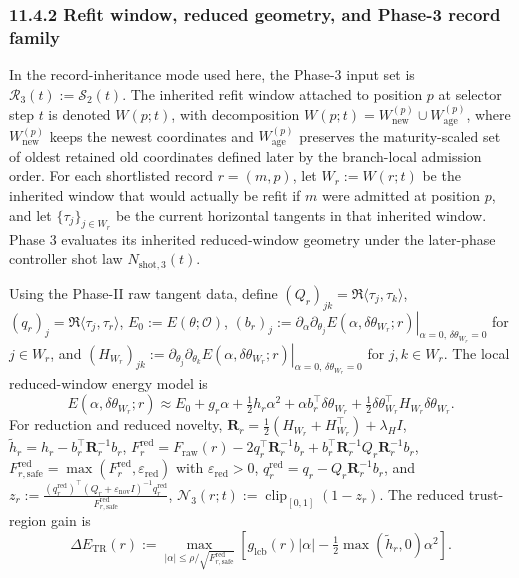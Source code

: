 \documentclass[11pt]{article}
\begin{document}
\subsubsection*{11.4.2 Refit window, reduced geometry, and Phase-3 record family}
In the record-inheritance mode used here, the Phase-3 input set is \(\mathcal R_3(t):=\mathcal S_2(t)\). The inherited refit window attached to position \(p\) at selector step \(t\) is denoted \(W(p;t)\), with decomposition \(W(p;t)=W_{\mathrm{new}}^{(p)}\cup W_{\mathrm{age}}^{(p)}\), where \(W_{\mathrm{new}}^{(p)}\) keeps the newest coordinates and \(W_{\mathrm{age}}^{(p)}\) preserves the maturity-scaled set of oldest retained old coordinates defined later by the branch-local admission order. For each shortlisted record \(r=(m,p)\), let \(W_r:=W(r;t)\) be the inherited window that would actually be refit if \(m\) were admitted at position \(p\), and let \(\{\tau_j\}_{j\in W_r}\) be the current horizontal tangents in that inherited window.
Phase 3 evaluates its inherited reduced-window geometry under the later-phase controller shot law \(N_{\mathrm{shot},3}(t)\).

Using the Phase-II raw tangent data, define \((Q_r)_{jk}=\Re\langle \tau_j,\tau_k\rangle\), \((q_r)_j=\Re\langle \tau_j,\tau_r\rangle\), \(E_0:=E(\theta;\mathcal O)\), \((b_r)_j:=\left.\partial_\alpha\partial_{\theta_j}E(\alpha,\delta\theta_{W_r};r)\right|_{\alpha=0,\,\delta\theta_{W_r}=0}\) for \(j\in W_r\), and \((H_{W_r})_{jk}:=\left.\partial_{\theta_j}\partial_{\theta_k}E(\alpha,\delta\theta_{W_r};r)\right|_{\alpha=0,\,\delta\theta_{W_r}=0}\) for \(j,k\in W_r\). The local reduced-window energy model is
\[
E(\alpha,\delta\theta_{W_r};r)
\approx
E_0+g_r\alpha+\tfrac12 h_r\alpha^2+\alpha b_r^\top\delta\theta_{W_r}+\tfrac12\delta\theta_{W_r}^\top H_{W_r}\delta\theta_{W_r}.
\]
For reduction and reduced novelty, \(\mathbf R_r=\tfrac12(H_{W_r}+H_{W_r}^{\top})+\lambda_H I\), \(\widetilde h_r=h_r-b_r^\top \mathbf R_r^{-1}b_r\), \(F_r^{\mathrm{red}}=F_{\mathrm{raw}}(r)-2q_r^\top \mathbf R_r^{-1}b_r+b_r^\top \mathbf R_r^{-1}Q_r\mathbf R_r^{-1}b_r\), \(F_{r,\mathrm{safe}}^{\mathrm{red}}=\max\!\left(F_r^{\mathrm{red}},\varepsilon_{\mathrm{red}}\right)\) with \(\varepsilon_{\mathrm{red}}>0\), \(q_r^{\mathrm{red}}=q_r-Q_r\mathbf R_r^{-1}b_r\), and \(z_r:=\frac{(q_r^{\mathrm{red}})^\top (Q_r+\varepsilon_{\mathrm{nov}}I)^{-1} q_r^{\mathrm{red}}}{F_{r,\mathrm{safe}}^{\mathrm{red}}}\), \(\mathcal N_3(r;t):=\operatorname{clip}_{[0,1]}\!\left(1-z_r\right)\). The reduced trust-region gain is
\[
\Delta E_{\mathrm{TR}}(r)
:=
\max_{|\alpha|\le \rho/\sqrt{F_{r,\mathrm{safe}}^{\mathrm{red}}}}
\left[g_{\mathrm{lcb}}(r)|\alpha|-\tfrac12\max(\widetilde h_r,0)\alpha^2\right].
\]
\end{document}

